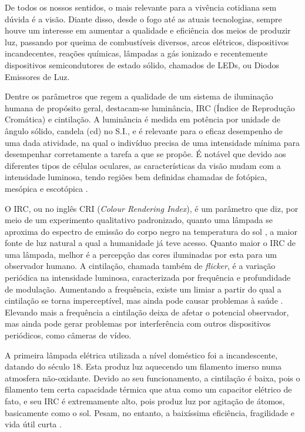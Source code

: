 \documentclass[
        12pt,
        openany, %
        oneside, %
        a4paper,			
        english,			
        brazil
        ]{abntbibufjf}
\begin{document}
De todos os nossos sentidos, o mais relevante para a vivência cotidiana sem dúvida é a visão. Diante disso, desde o fogo até as atuais tecnologias, sempre houve um interesse em aumentar a qualidade e eficiência dos meios de produzir luz, passando por queima de combustíveis diversos, arcos elétricos, dispositivos incandecentes, reações químicas, lâmpadas a gás ionizado e recentemente dispositivos semicondutores de estado sólido, chamados de LEDs, ou Diodos Emissores de Luz.

Dentre os parâmetros que regem a qualidade de um sistema de iluminação humana de propósito geral, destacam-se luminância, IRC (Índice de Reprodução Cromática) e cintilação. A luminância é medida em potência por unidade de ângulo sólido, candela (cd) no S.I., e é relevante para o eficaz desempenho de uma dada atividade, na qual o indivíduo precisa de uma intensidade mínima para desempenhar corretamente a tarefa a que se propôe. É notável que devido aos diferentes tipos de células oculares, as características da visão mudam com a intensidade luminosa, tendo regiões bem definidas chamadas de fotópica, mesópica e escotópica \cite{cie-foto}.

O IRC, ou no inglês CRI (\textit{Colour Rendering Index}), é um parâmetro que diz, por meio de um experimento qualitativo padronizado, quanto uma lâmpada se aproxima do espectro de emissão do corpo negro na temperatura do sol \cite{cie-irc}, a maior fonte de luz natural a qual a humanidade já teve acesso. Quanto maior o IRC de uma lâmpada, melhor é a percepção das cores iluminadas por esta para um observador humano. A cintilação, chamada também de \textit{flicker}, é a variação periódica na intensidade luminosa, caracterizada por frequência e profundidade de modulação. Aumentando a frequência, existe um limiar a partir do qual a cintilação se torna imperceptível, mas ainda pode causar problemas à saúde \cite{ieee-flicker}. Elevando mais a frequência a cintilação deixa de afetar o potencial observador, mas ainda pode gerar problemas por interferência com outros dispositivos periódicos, como câmeras de vídeo.

A primeira lâmpada elétrica utilizada a nível doméstico foi a incandescente, datando do século 18. Esta produz luz aquecendo um filamento imerso numa atmosfera não-oxidante. Devido ao seu funcionamento, a cintilação é baixa, pois o filamento tem certa capacidade térmica que atua como um capacitor elétrico de fato, e seu IRC é extremamente alto, pois produz luz por agitação de átomos, basicamente como o sol. Pesam, no entanto, a baixíssima eficiência, fragilidade e vida útil curta \cite{led-1}.
\end{document}
